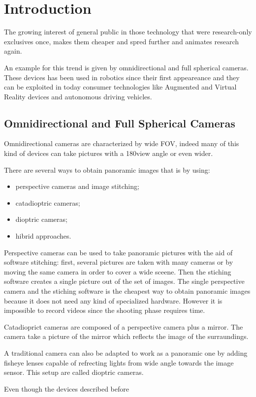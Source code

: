 \chapter{Introduction}
The growing interest of general public in those technology that were 
research-only exclusives once, makes them cheaper and spred further and
animates research again.

An example for this trend is given by omnidirectional and full spherical 
cameras.
These devices has been used in robotics since their first appeareance and they 
can be exploited in today consumer technologies like Augmented and Virtual 
Reality devices and autonomous driving vehicles.

\section{Omnidirectional and Full Spherical Cameras}
\label{sec:cameraclassification}
Omnidirectional cameras are characterized by wide FOV, indeed many of this kind
of devices can take pictures with a 180\degree view angle or even wider.

There are several ways to obtain panoramic images that is by using:
\begin{itemize}
	\item perspective cameras and image stitching;
	\item catadioptric cameras;
	\item dioptric cameras;
	\item hibrid approaches.
\end{itemize}

Perspective cameras can be used to take panoramic pictures with the aid of 
software stitching: first, several pictures are taken with many cameras or by moving 
the same camera in order to cover a wide sceene. Then the stiching software 
creates a single picture out of the set of images.
The single perspective camera and the stiching software is the cheapest 
way to obtain panoramic images because it does not need any kind of specialized 
hardware. However it is impossible to record videos since the shooting phase 
requires time.

Catadioprict cameras are composed of a perspective camera plus a mirror. 
The camera take a picture of the mirror which reflects the image of the 
surraundings.

A traditional camera can also be adapted to work as a panoramic one by adding
fisheye lenses capable of refrecting lights from wide angle towards the 
image sensor. This setup are called dioptric cameras.

Even though the devices described before 
